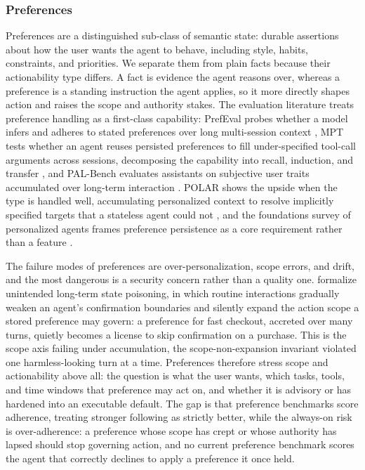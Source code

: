 \subsubsection{Preferences}

Preferences are a distinguished sub-class of semantic state: durable assertions about how the user wants the agent to behave, including style, habits, constraints, and priorities. We separate them from plain facts because their actionability type differs. A fact is evidence the agent reasons over, whereas a preference is a standing instruction the agent applies, so it more directly shapes action and raises the scope and authority stakes. The evaluation literature treats preference handling as a first-class capability: PrefEval probes whether a model infers and adheres to stated preferences over long multi-session context \citep{zhao2025prefeval}, MPT tests whether an agent reuses persisted preferences to fill under-specified tool-call arguments across sessions, decomposing the capability into recall, induction, and transfer \citep{yoon2026mpt}, and PAL-Bench evaluates assistants on subjective user traits accumulated over long-term interaction \citep{huang2025mempal}. POLAR shows the upside when the type is handled well, accumulating personalized context to resolve implicitly specified targets that a stateless agent could not \citep{lee2026polar}, and the foundations survey of personalized agents frames preference persistence as a core requirement rather than a feature \citep{xu2026personalizedllmpoweredagentsfoundations}.

The failure modes of preferences are over-personalization, scope errors, and drift, and the most dangerous is a security concern rather than a quality one. \citet{xu2026toxicchats} formalize unintended long-term state poisoning, in which routine interactions gradually weaken an agent's confirmation boundaries and silently expand the action scope a stored preference may govern: a preference for fast checkout, accreted over many turns, quietly becomes a license to skip confirmation on a purchase. This is the scope axis failing under accumulation, the scope-non-expansion invariant violated one harmless-looking turn at a time. Preferences therefore stress scope and actionability above all: the question is what the user wants, which tasks, tools, and time windows that preference may act on, and whether it is advisory or has hardened into an executable default. The gap is that preference benchmarks score adherence, treating stronger following as strictly better, while the always-on risk is over-adherence: a preference whose scope has crept or whose authority has lapsed should stop governing action, and no current preference benchmark scores the agent that correctly declines to apply a preference it once held.

